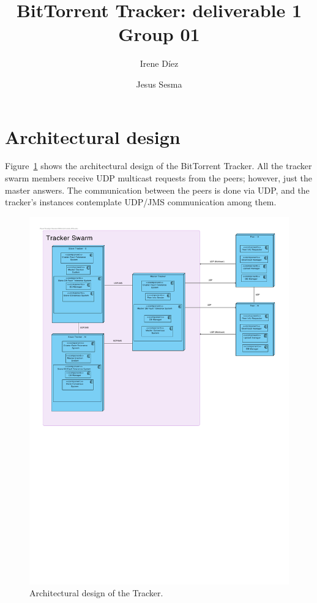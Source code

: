 \documentclass[twoside,a4paper,10pt]{article}
\title{BitTorrent Tracker: deliverable 1\\
  Group 01}
\author{Irene Díez \and Jesus Sesma}
\begin{document}
\date{}
\maketitle


\section{Architectural design}

Figure~\ref{fig:arch} shows the architectural design of the BitTorrent Tracker.
All the tracker swarm members receive UDP multicast requests from the peers;
however, just the master answers.
The communication between the peers is done via UDP, and the
tracker's instances contemplate UDP/JMS communication among them.

\begin{figure}[h]
  \centering
  \includegraphics[width=\textwidth]{vp/architectural-design.pdf}
  \caption{\label{fig:arch}Architectural design of the Tracker.}
\end{figure}
\end{document}
